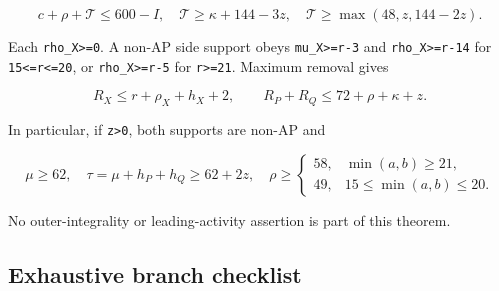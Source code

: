 \documentclass[10pt,a4paper]{article}
\theoremstyle{definition}
\begin{document}
\[
 c+\allowbreak{}\rho+\allowbreak{}\mathcal T\le600-I,\allowbreak{}
 \quad\mathcal T\ge\kappa+\allowbreak{}144-3z,\allowbreak{}
 \quad\mathcal T\ge\max(48,\allowbreak{}z,\allowbreak{}144-2z).
\]

Each \texttt{rho\_\allowbreak{}\allowbreak{}X>=\allowbreak{}0}. A non-AP side support obeys
\texttt{mu\_\allowbreak{}\allowbreak{}X>=\allowbreak{}r-3} and
\texttt{rho\_\allowbreak{}\allowbreak{}X>=\allowbreak{}r-14} for
\texttt{15<=\allowbreak{}r<=\allowbreak{}20},\allowbreak{} or
\texttt{rho\_\allowbreak{}\allowbreak{}X>=\allowbreak{}r-5} for
\texttt{r>=\allowbreak{}21}. Maximum removal gives

\[
 R_X\le r+\allowbreak{}\rho_X+\allowbreak{}h_X+\allowbreak{}2,\allowbreak{}
 \qquad R_P+\allowbreak{}R_Q\le72+\allowbreak{}\rho+\allowbreak{}\kappa+\allowbreak{}z.
\]

In particular,\allowbreak{} if \texttt{z>0},\allowbreak{} both supports are
non-AP and

\[
 \mu\ge62,\allowbreak{}\quad\tau=\allowbreak{}\mu+\allowbreak{}h_P+\allowbreak{}h_Q\ge62+\allowbreak{}2z,\allowbreak{}
 \quad\rho\ge\begin{cases}58,\allowbreak{}&\min(a,\allowbreak{}b)\ge21,\allowbreak{}\\49,\allowbreak{}&15\le\min(a,\allowbreak{}b)\le20.\end{cases}
\]

No outer-integrality or leading-activity assertion is part of this
theorem.

\hypertarget{exhaustive-branch-checklist}{%
\subsection{Exhaustive branch
checklist}\label{exhaustive-branch-checklist}}
\end{document}
